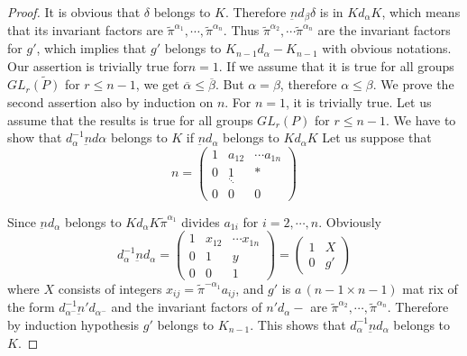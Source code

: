 \begin{proof}
   It is obvious that $\delta$ belongs to $K$. Therefore
   $\underbar{n}d_ \beta \delta$ is in $Kd_\alpha  K$, which means
   that its invariant  factors are $ {\tilde{\pi}^{\alpha _1}},
   \cdots, {\tilde{\pi}^{\alpha _n}}$. Thus
   ${\tilde{\pi}^{\alpha _2}},  \cdots {\tilde{\pi}^{\alpha
       _n}}$ are the invariant factors for $g'$, which implies
   that $g'$ belongs  to $K_{n-1} d _\alpha - K_{n-1}$ with obvious
   notations. Our assertion is trivially true for$ n= 1$. If we assume
   that it is true for all  groups  $ G L _r \tilde{(P)}$ for
   $r\leq n-1$, we get $\overline \alpha \leq \overline\beta$. But
   $\alpha = \beta$,
   therefore $ \alpha  \leq \beta$. We  prove the second assertion
   also by induction on $n$. For $n=1$, it is trivially true. Let us
   assume that  the results is true for all groups $GL_r(P)$ for $r
   \leq n-1$. We have to show that $d^{-1}_\alpha \underbar{n}d \alpha  $
   belongs to $K$ if $ \underbar{n} d_\alpha $ belongs to $K d_\alpha
   K$  Let us suppose that  
   \begin{equation*}
     n =
     \begin{pmatrix}
       1& a_{12}& \cdots a_{1n}\\
       0 & \underset{\ddots}1&  *\\
       0 & 0 &0
     \end{pmatrix}
   \end{equation*}
   
   Since $\underbar{n} d_\alpha$ belongs to $Kd_\alpha K
   \tilde{\pi}^{\alpha _1}$ divides $a_{1i}$ for $i = 2,
   \cdots,n$. Obviously 
   \begin{equation*}
     d^{-1}_{\alpha } \underbar{n}d_\alpha  =
     \begin{pmatrix}
       1& x_{12}& \cdots x_{1n}\\
       0 & 1&y\\
       0 & 0 &1
     \end{pmatrix}
     = 
     \begin{pmatrix}
       1&X\\
       0&g'
     \end{pmatrix}
   \end{equation*}\pageoriginale
   where $X$ consists of integers $x_{ij} = \tilde{\pi}^{-\alpha
     _1}  a_{ij}$, and $ g'$ is $a \,(n -1 \times n -1)
   $ mat rix of the form $d_{\alpha ^-}^ {-1}  \underbar{n}' d_{\alpha
     ^-}$ and the invariant factors of $ n'd _{\alpha}-$ are $
   \tilde{\pi}^{\alpha_2}, \cdots, \tilde{\pi}^{\alpha
     _n}$. Therefore by induction hypothesis $g'$ belongs to
   $K_{n-1}$. This shows that $ d^{-1}_{\alpha }  \underbar{n}d_\alpha$ 
   belongs to $K$. 
\end{proof}

